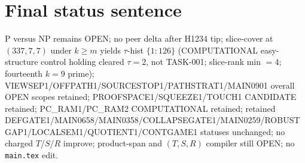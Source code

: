 \documentclass[11pt]{article}
\begin{document}
\section*{Final status sentence}
P versus NP remains OPEN; no peer delta after H1234 tip; slice-cover at $(337,7,7)$ under $k{\ge}m$ yields $\tau$-hist $\{1{:}126\}$ (COMPUTATIONAL easy-structure control holding cleared $\tau{=}2$, not TASK-001; slice-rank min $=4$; fourteenth $k{=}9$ prime); VIEWSEP1/OFFPATH1/SOURCESTOP1/PATHSTRAT1/MAIN0901 overall OPEN scopes retained; PROOFSPACE1/SQUEEZE1/TOUCH1 CANDIDATE retained; PC\_RAM1/PC\_RAM2 COMPUTATIONAL retained; retained DEFGATE1/MAIN0658/MAIN0358/COLLAPSEGATE1/MAIN0259/ROBUSTGAP1/LOCALSEM1/QUOTIENT1/CONTGAME1 statuses unchanged; no charged $T$/$S$/$R$ improve; product-span and $(T,S,R)$ compiler still OPEN; no \texttt{main.tex} edit.
\end{document}
